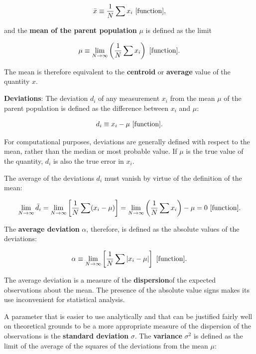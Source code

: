 \documentclass[a4paper,10pt]{article}
\begin{document}
\begin{align*}
    \bar{x} \equiv \frac{1}{N} \sum x_i ~ [{\rm function}],
\end{align*}

{\noindent}and the \textbf{mean of the parent population} $\mu$ is defined as the limit

\begin{align*}
    \mu \equiv \lim_{N\rightarrow\infty}\left( \frac{1}{N} \sum x_i \right) ~ [{\rm function}].
\end{align*}

{\noindent}The mean is therefore equivalent to the \textbf{centroid} or \textbf{average} value of the quantity $x$.

{\noindent}\textbf{Deviations}: The deviation $d_i$ of any measurement $x_i$ from the mean $\mu$ of the parent population is defined as the difference between $x_i$ and $\mu$:

\begin{align*}
    d_i \equiv x_i - \mu ~ [{\rm function}].
\end{align*}

{\noindent}For computational purposes, deviations are generally defined with respect to the mean, rather than the median or most probable value. If $\mu$ is the true value of the quantity, $d_i$ is also the true error in $x_i$.

{\noindent}The average of the deviations $d_i$ must vanish by virtue of the definition of the mean:

\begin{align*}
    \lim_{N\rightarrow\infty} \bar{d_i} = \lim_{N\rightarrow\infty} \left[ \frac{1}{N} \sum(x_i-\mu) \right] = \lim_{N\rightarrow\infty}\left(\frac{1}{N}\sum x_i\right) - \mu = 0 ~ [{\rm function}].
\end{align*}

{\noindent}The \textbf{average deviation} $\alpha$, therefore, is defined as the absolute values of the deviations:

\begin{align*}
    \alpha \equiv \lim_{N\rightarrow\infty}\left[ \frac{1}{N} \sum \left\lvert x_i-\mu\right\rvert \right] ~ [{\rm function}].
\end{align*}

{\noindent}The average deviation is a measure of the \textbf{dispersion}of the expected observations about the mean. The presence of the absolute value signs makes its use inconvenient for statistical analysis.

{\noindent}A parameter that is easier to use analytically and that can be justified fairly well on theoretical grounds to be a more appropriate measure of the dispersion of the observations is the \textbf{standard deviation} $\sigma$. The \textbf{variance} $\sigma^2$ is defined as the limit of the average of the squares of the deviations from the mean $\mu$:
\end{document}
